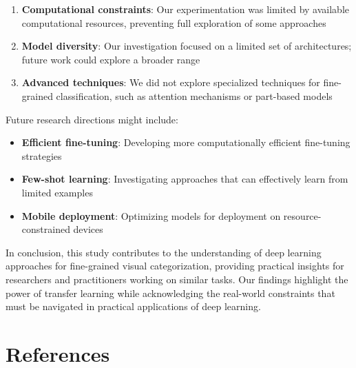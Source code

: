 \documentclass[
]{article}
\providecommand{\tightlist}{%
  \setlength{\itemsep}{0pt}\setlength{\parskip}{0pt}}\usepackage{longtable,booktabs,array}
\begin{document}
\begin{enumerate}
\def\labelenumi{\arabic{enumi}.}
\tightlist
\item
  \textbf{Computational constraints}: Our experimentation was limited by
  available computational resources, preventing full exploration of some
  approaches
\item
  \textbf{Model diversity}: Our investigation focused on a limited set
  of architectures; future work could explore a broader range
\item
  \textbf{Advanced techniques}: We did not explore specialized
  techniques for fine-grained classification, such as attention
  mechanisms or part-based models
\end{enumerate}

Future research directions might include:

\begin{itemize}
\tightlist
\item
  \textbf{Efficient fine-tuning}: Developing more computationally
  efficient fine-tuning strategies
\item
  \textbf{Few-shot learning}: Investigating approaches that can
  effectively learn from limited examples
\item
  \textbf{Mobile deployment}: Optimizing models for deployment on
  resource-constrained devices
\end{itemize}

In conclusion, this study contributes to the understanding of deep
learning approaches for fine-grained visual categorization, providing
practical insights for researchers and practitioners working on similar
tasks. Our findings highlight the power of transfer learning while
acknowledging the real-world constraints that must be navigated in
practical applications of deep learning.

\section*{References}\label{references}
\end{document}
